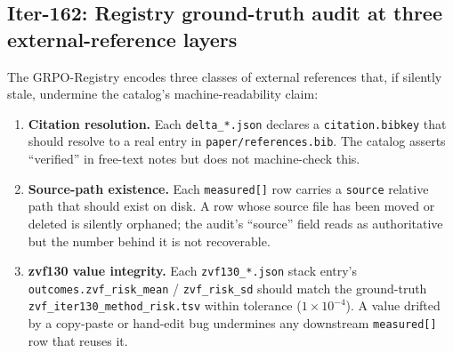 %
%
%

\subsection{Iter-162: Registry ground-truth audit at three external-reference layers}
\label{sec:p6_iter162_groundtruth_audit}

The GRPO-Registry encodes three classes of external references that, if
silently stale, undermine the catalog's machine-readability claim:

\begin{enumerate}
\item \textbf{Citation resolution.} Each \texttt{delta\_*.json} declares a
\texttt{citation.bibkey} that should resolve to a real entry in
\texttt{paper/references.bib}. The catalog asserts ``verified'' in
free-text notes but does not machine-check this.
\item \textbf{Source-path existence.} Each \texttt{measured[]} row carries
a \texttt{source} relative path that should exist on disk. A row whose
source file has been moved or deleted is silently orphaned; the audit's
``source'' field reads as authoritative but the number behind it is not
recoverable.
\item \textbf{zvf130 value integrity.} Each \texttt{zvf130\_*.json} stack
entry's \texttt{outcomes.zvf\_risk\_mean} / \texttt{zvf\_risk\_sd} should
match the ground-truth \texttt{zvf\_iter130\_method\_risk.tsv} within
tolerance ($1\!\times\!10^{-4}$). A value drifted by a copy-paste or
hand-edit bug undermines any downstream \texttt{measured[]} row that
reuses it.
\end{enumerate}

